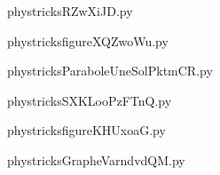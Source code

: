 
    \newcommand{\CaptionFigRZwXiJD}{<+Type your caption here+>}
    \begin{center}
        
    \end{center}
    phystricksRZwXiJD.py

    

    \clearpage
    


    \newcommand{\CaptionFigfigureXQZwoWu}{<+Type your caption here+>}
    \begin{center}
        
    \end{center}
    phystricksfigureXQZwoWu.py

    

    \clearpage
    


    \newcommand{\CaptionFigParaboleUneSolPktmCR}{<+Type your caption here+>}
    \begin{center}
        
    \end{center}
    phystricksParaboleUneSolPktmCR.py

    

    \clearpage
    


    \newcommand{\CaptionFigSXKLooPzFTnQ}{<+Type your caption here+>}
    \begin{center}
        
    \end{center}
    phystricksSXKLooPzFTnQ.py

    

    \clearpage
    


    \newcommand{\CaptionFigfigureKHUxoaG}{<+Type your caption here+>}
    \begin{center}
        
    \end{center}
    phystricksfigureKHUxoaG.py

    

    \clearpage
    


    \newcommand{\CaptionFigGrapheVarndvdQM}{<+Type your caption here+>}
    \begin{center}
        
    \end{center}
    phystricksGrapheVarndvdQM.py


